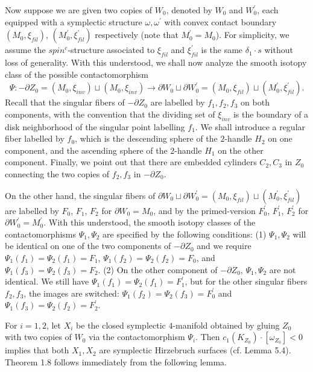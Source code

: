 \documentclass[11pt]{amsart}
\theoremstyle{plain}
\numberwithin{theorem}{section}
\theoremstyle{definition}
\begin{document}
Now suppose we are given two copies of $W_0$, denoted by $W_0$ and $W_0^\prime$, each equipped with a symplectic structure $\omega,\omega^\prime$ with convex contact boundary $(M_0,\xi_{fil})$, 
$(M_0^\prime,\xi_{fil}^\prime)$ respectively (note that $M_0^\prime=M_0$). For simplicity, we assume the $spin^c$-structure associated to $\xi_{fil}$ and $\xi_{fil}^\prime$ is the same $\delta_1\cdot s$ without loss of generality. With this understood, we shall now analyze the smooth isotopy class of the possible contactomorphism
$$
\Psi: -\partial Z_0=(M_0,\xi_{inv})\sqcup (M_0,\xi_{inv})\rightarrow \partial W_0\sqcup \partial W_0^\prime =(M_0,\xi_{fil})\sqcup (M_0^\prime,\xi_{fil}^\prime).
$$
Recall that the singular fibers of $-\partial Z_0$ are labelled by $f_1,f_2,f_3$ on both components,
with the convention that the dividing set of $\xi_{inv}$ is the boundary of a disk neighborhood of the singular point labelling $f_1$. We shall introduce a regular fiber labelled by $f_0$, which is the descending sphere of the
$2$-handle $H_2$ on one component, and the ascending sphere of the $2$-handle $H_1$ on the other component. Finally, we point out that there are embedded cylinders $C_2,C_3$ in $Z_0$ connecting the two copies of $f_2,f_3$ in $-\partial Z_0$. 

On the other hand, the singular fibers of $\partial W_0\sqcup \partial W_0^\prime
=(M_0,\xi_{fil})\sqcup (M_0^\prime,\xi_{fil}^\prime)$ are labelled by $F_0$, $F_1$, $F_2$ 
for $\partial W_0=M_0$, and by the primed-version $F_0^\prime$, $F_1^\prime$, $F_2^\prime$ 
for $\partial W_0^\prime=M_0^\prime$.
With this understood, the smooth isotopy classes of the contactomorphisms $\Psi_1,\Psi_2$ are specified by the following conditions: (1) $\Psi_1,\Psi_2$ will be identical on one of the two components of 
$-\partial Z_0$ and we require $\Psi_1(f_1)=\Psi_2(f_1)=F_1$, $\Psi_1(f_2)=\Psi_2(f_2)=F_0$, and
$\Psi_1(f_3)=\Psi_2(f_3)=F_2$. (2) On the other component of $-\partial Z_0$, $\Psi_1,\Psi_2$ are not identical. We still have $\Psi_1(f_1)=\Psi_2(f_1)=F_1^\prime$, but for the other singular fibers $f_2,f_3$, the images are switched: $\Psi_1(f_2)=\Psi_2(f_3)=F_0^\prime$ 
and $\Psi_1(f_3)=\Psi_2(f_2)=F_2^\prime$.

For $i=1,2$, let $X_i$ be the closed symplectic $4$-manifold obtained by gluing $Z_0$ with two
copies of $W_0$ via the contactomorphism $\Psi_i$. Then $c_1(K_{Z_0})\cdot [\omega_{Z_0}]<0$
implies that both $X_1,X_2$ are symplectic Hirzebruch surfaces (cf. Lemma 5.4). Theorem 1.8 follows immediately from the following lemma.
\end{document}
